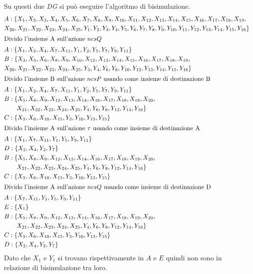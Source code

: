 \documentclass[a4paper]{article}
\begin{document}
Su questi due \textit{DG} si può eseguire l'algoritmo di bisimulazione.
\begin{align*}
	&A : \{X_1,X_2,X_3,X_4,X_5,X_6,X_7,X_8,X_9,X_{10},X_{11},X_{12},X_{13},X_{14},X_{15},X_{16},X_{17},X_{18},X_{19},
     \\ &X_{20},X_{21},X_{22},X_{23},X_{24},X_{25},Y_1,Y_2,Y_3,Y_4,Y_5,Y_6,Y_7,Y_8,Y_9,Y_{10},Y_{11},Y_{12},Y_{13},Y_{14},Y_{15},Y_{16}\}\\
     \intertext{Divido l'insieme A sull'azione $ncsQ$}
	&A: \{X_1,X_2,X_4,X_7,X_{11},Y_1,Y_2,Y_5,Y_7,Y_9,Y_{11}\}\\
	&B: \{X_3,X_5,X_6,X_8,X_9,X_{10},X_{12},X_{13},X_{14},X_{15},X_{16},X_{17},X_{18},X_{19},\\&X_{20},X_{21},X_{22},X_{23},X_{24},X_{25},Y_3,Y_4,Y_6,Y_8,Y_{10},Y_{12},Y_{13},Y_{14},Y_{15},Y_{16}\}\\
     \intertext{Divido l'insieme B sull'azione $ncsP$ usando come insieme di destinazione B}
	&A: \{X_1,X_2,X_4,X_7,X_{11},Y_1,Y_2,Y_5,Y_7,Y_9,Y_{11}\}\\
	&B: \{X_5,X_8,X_9,X_{12},X_{13},X_{14},X_{16},X_{17},X_{18},X_{19},X_{20},\\& \qquad X_{21},X_{22},X_{23},X_{24},X_{25},Y_4,Y_6,Y_8,Y_{12},Y_{14},Y_{16}\}\\
	&C: \{X_3,X_6,X_{10},X_{15},Y_3,Y_{10},Y_{13},Y_{15} \}\\
     \intertext{Divido l'insieme A sull'azione $\tau$ usando come insieme di destinazione A}
	&A: \{X_1,X_7,X_{11},Y_1,Y_5,Y_9,Y_{11}\}\\
	&D: \{X_2,X_4,Y_2,Y_7\}\\
	&B: \{X_5,X_8,X_9,X_{12},X_{13},X_{14},X_{16},X_{17},X_{18},X_{19},X_{20},\\& \qquad X_{21},X_{22},X_{23},X_{24},X_{25},Y_4,Y_6,Y_8,Y_{12},Y_{14},Y_{16}\}\\
	&C: \{X_3,X_6,X_{10},X_{15},Y_3,Y_{10},Y_{13},Y_{15} \}\\
     \intertext{Divido l'insieme A sull'azione $ncsQ$ usando come insieme di destinazione D}
	&A: \{X_7,X_{11},Y_1,Y_5,Y_9,Y_{11}\}\\
	&E: \{X_1\}\\
	&B: \{X_5,X_8,X_9,X_{12},X_{13},X_{14},X_{16},X_{17},X_{18},X_{19},X_{20},\\& \qquad X_{21},X_{22},X_{23},X_{24},X_{25},Y_4,Y_6,Y_8,Y_{12},Y_{14},Y_{16}\}\\
	&C: \{X_3,X_6,X_{10},X_{15},Y_3,Y_{10},Y_{13},Y_{15} \}\\
	&D: \{X_2,X_4,Y_2,Y_7\}\\
\end{align*}
Dato che $X_1$ e $Y_1$ si trovano rispettivamente in $A$ e $E$ quindi non sono in relazione di bisimulazione tra loro.
\newpage
\end{document}
